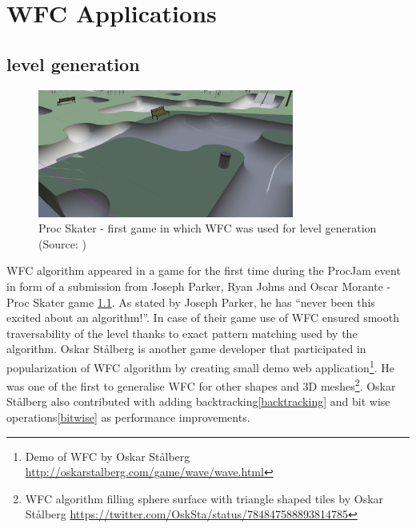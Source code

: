 \documentclass[shortabstract, english, inz]{iithesis}
\begin{document}
\chapter{WFC Applications}
\label{chapter2}
\section{level generation}
\begin{figure}[H]
\centering
\includegraphics[width=0.75\textwidth, angle=0]{images/skater.png}
\caption{Proc Skater - first game in which WFC was used for level generation (Source: \cite{skater})}
\label{fig:skater}
\end{figure}
WFC algorithm appeared in a game for the first time during the ProcJam event in form of a submission from Joseph Parker, Ryan Johns and Oscar Morante - Proc Skater game \ref{fig:skater}. As stated by Joseph Parker, he has “never been this excited about an algorithm!”. In case of their game use of WFC ensured smooth traversability of the level thanks to exact pattern matching used by the algorithm.\break
 Oskar Stålberg is another game developer that participated in popularization of WFC algorithm by creating small demo web application\footnote{Demo of WFC by  Oskar Stålberg \url{http://oskarstalberg.com/game/wave/wave.html}}. He was one of the first to generalise WFC for other shapes and 3D meshes\footnote{WFC algorithm filling sphere surface with triangle shaped tiles by Oskar Stålberg \url{https://twitter.com/OskSta/status/784847588893814785}}. Oskar Stålberg also contributed with adding backtracking\ref{backtracking} and bit wise operations\ref{bitwise} as performance improvements.\cite{Smith}
\end{document}
